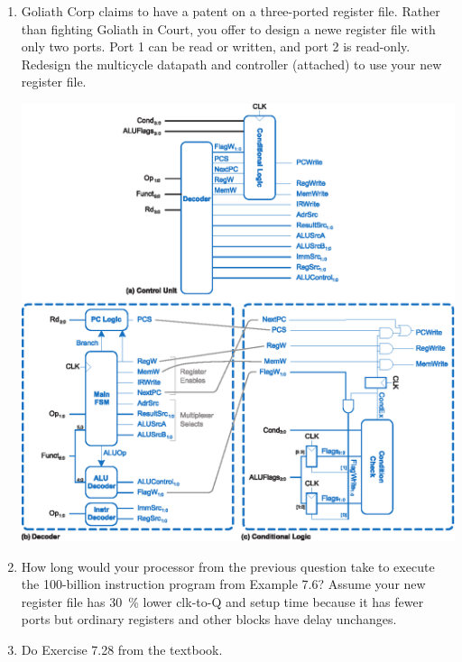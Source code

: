 \documentclass{e85}
\begin{document}
\begin{enumerate}
\item Goliath Corp claims to have a patent on a three-ported register
  file.  Rather than fighting Goliath in Court, you offer to design a
  newe register file with only two ports.  Port 1 can be read or
  written, and port 2 is read-only.  Redesign the multicycle datapath
  and controller (attached) {\figurebelow} to use your new register
  file.
  \begin{center}
    \includegraphics[width=\linewidth]
    {figures/ddca-multicycle-control-unit.eps}
  \end{center}

  \begin{solution}
  \end{solution}

\item How long would your processor from the previous question take to
  execute the 100-billion instruction program from Example 7.6?
  Assume your new register file has \SI{30}{\percent} lower clk-to-Q
  and setup time because it has fewer ports but ordinary registers and
  other blocks have delay unchanges.

  \begin{solution}
  \end{solution}

\item Do Exercise 7.28 from the textbook.


\end{enumerate}
\end{document}
